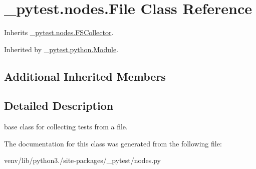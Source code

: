 \hypertarget{class__pytest_1_1nodes_1_1_file}{}\section{\+\_\+pytest.\+nodes.\+File Class Reference}
\label{class__pytest_1_1nodes_1_1_file}


Inherits \hyperlink{class__pytest_1_1nodes_1_1_f_s_collector}{\+\_\+pytest.\+nodes.\+F\+S\+Collector}.



Inherited by \hyperlink{class__pytest_1_1python_1_1_module}{\+\_\+pytest.\+python.\+Module}.

\subsection*{Additional Inherited Members}


\subsection{Detailed Description}
\begin{DoxyVerb}base class for collecting tests from a file. \end{DoxyVerb}
 

The documentation for this class was generated from the following file\+:\begin{DoxyCompactItemize}
\item 
venv/lib/python3./site-\/packages/\+\_\+pytest/nodes.\+py\end{DoxyCompactItemize}
